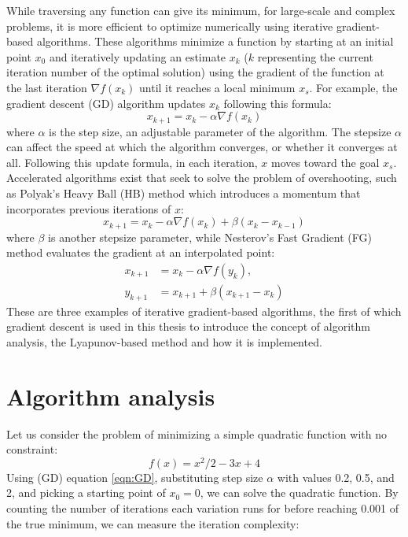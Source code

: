 While traversing any function can give its minimum, for large-scale and complex problems, it is more efficient to optimize numerically using iterative gradient-based algorithms. These algorithms minimize a function by starting at an initial point \(x_{0}\) and iteratively updating an estimate \(x_k\) (\(k\) representing the current iteration number of the optimal solution) using the gradient of the function at the last iteration $\nabla f(x_k)$ until it reaches a local minimum \(x_s\). For example, the gradient descent (GD) algorithm updates \(x_k\) following this formula:
\begin{equation}\label{eqn:GD}
  x_{k+1}=x_{k}-\alpha \nabla f(x_k)
\end{equation}
where $\alpha$ is the step size, an adjustable parameter of the algorithm. The stepsize $\alpha$ can affect the speed at which the algorithm converges, or whether it converges at all. Following this update formula, in each iteration, \(x\) moves toward the goal \(x_s\). Accelerated algorithms exist that seek to solve the problem of overshooting, such as Polyak’s Heavy Ball (HB) method which introduces a momentum that incorporates previous iterations of \(x\):
\begin{equation}\label{eqn:HB}
  x_{k+1}=x_k-\alpha \nabla f(x_k)+ \beta (x_k-x_{k-1})
\end{equation}
where $\beta$ is another stepsize parameter, while Nesterov’s Fast Gradient (FG) method evaluates the gradient at an interpolated point:
\begin{subequations} \label{eqn:FG}
  \begin{align}
    x_{k+1}     &=x_k-\alpha \nabla f(y_k), \label{eq_state}       \\
    y_{k+1} &=x_{k+1}+\beta (x_{k+1}-x_k) \label{eq_interpolated point}
  \end{align}
  \end{subequations}
These are three examples of iterative gradient-based algorithms, the first of which gradient descent is used in this thesis to introduce the concept of algorithm analysis, the Lyapunov-based method and how it is implemented.
\section{Algorithm analysis}
Let us consider the problem of minimizing a simple quadratic function with no constraint:
\begin{equation} \label{eqn:quadratic}
    f(x) = x^2/2 - 3x + 4
\end{equation}
Using (GD) equation \eqref{eqn:GD}, substituting step size $\alpha$ with values 0.2, 0.5, and 2, and picking a starting point of $x_0 = 0$, we can solve the quadratic function. By counting the number of iterations each variation runs for before reaching 0.001 of the true minimum, we can measure the iteration complexity: 

